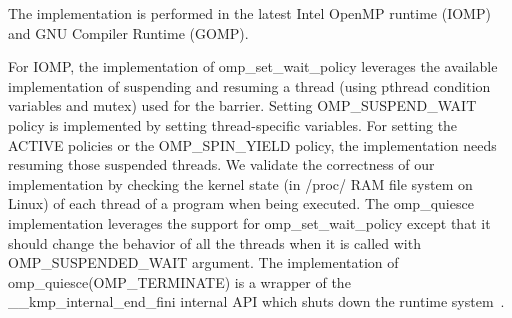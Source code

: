 The implementation is performed in the latest Intel OpenMP runtime (IOMP) and GNU Compiler Runtime (GOMP). %

For IOMP, the implementation of {\sf omp\_set\_wait\_policy} leverages the available 
implementation of suspending and resuming a thread (using pthread condition variables and mutex) 
used for the barrier. Setting  
{\sf OMP\_SUSPEND\_WAIT} policy is implemented by setting thread-specific variables. For
setting the {\sf ACTIVE} policies or the {\sf OMP\_SPIN\_YIELD} policy, 
the implementation needs resuming those suspended threads. %
We validate the correctness of our implementation by checking the kernel state (in /proc/ RAM file system on Linux) 
of each thread of a program when being executed. 
The {\sf omp\_quiesce} implementation leverages the support for {\sf omp\_set\_wait\_policy} except that it 
should change the behavior of all the threads when it is called with {\sf OMP\_SUSPENDED\_WAIT} argument. 
The implementation of {\sf omp\_quiesce(OMP\_TERMINATE)} is a wrapper of 
the {\sf \_\_kmp\_internal\_end\_fini} internal API which shuts down the runtime system~\cite{iccmanual}. 



